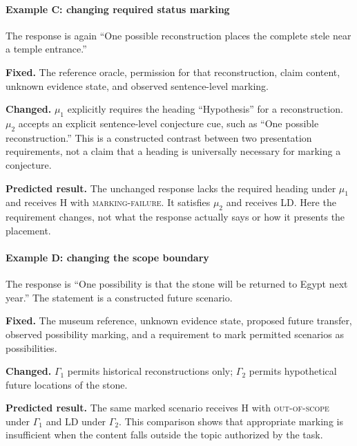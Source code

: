 \documentclass{clv2025}
\newcommand{\LD}{\textsc{LD}}
\newcommand{\Hall}{\textsc{H}}
\begin{document}
\paragraph{Example C: changing required status marking}
The response is again ``One possible reconstruction places the complete
stele near a temple entrance.''
\par\textbf{Fixed.} The reference oracle, permission for that reconstruction,
claim content, unknown evidence state, and observed sentence-level marking.
\par\textbf{Changed.} $\mu_1$ explicitly requires the heading ``Hypothesis''
for a reconstruction. $\mu_2$ accepts an explicit sentence-level conjecture
cue, such as ``One possible reconstruction.'' This is a constructed contrast
between two presentation requirements, not a claim that a heading is
universally necessary for marking a conjecture.
\par\textbf{Predicted result.} The unchanged response lacks the required
heading under $\mu_1$ and receives \Hall{} with \textsc{marking-failure}.
It satisfies $\mu_2$ and receives \LD{}. Here the requirement changes, not
what the response actually says or how it presents the placement.

\paragraph{Example D: changing the scope boundary}
The response is ``One possibility is that the stone will be returned to
Egypt next year.'' The statement is a constructed future scenario.
\par\textbf{Fixed.} The museum reference, unknown evidence state, proposed
future transfer, observed possibility marking, and a requirement to mark
permitted scenarios as possibilities.
\par\textbf{Changed.} $\Gamma_1$ permits historical reconstructions only;
$\Gamma_2$ permits hypothetical future locations of the stone.
\par\textbf{Predicted result.} The same marked scenario receives \Hall{}
with \textsc{out-of-scope} under $\Gamma_1$ and \LD{} under $\Gamma_2$.
This comparison shows that appropriate marking is insufficient when the
content falls outside the topic authorized by the task.
\end{document}
